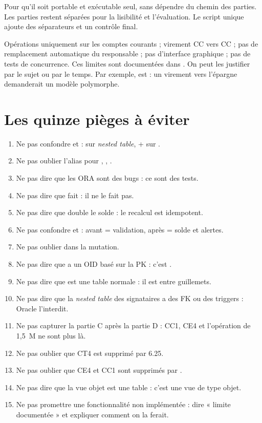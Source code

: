 {Pour qu'il soit portable et exécutable seul, sans dépendre du chemin des
parties.}
{Les parties restent séparées pour la lisibilité et l'évaluation. Le script
unique ajoute des séparateurs et un contrôle final.}

{Opérations uniquement sur les comptes courants ; virement CC vers CC ; pas de
remplacement automatique du responsable ; pas d'interface graphique ; pas de
tests de concurrence.}
{Ces limites sont documentées dans . On peut les
justifier par le sujet ou par le temps. Par exemple,
 est  : un
virement vers l'épargne demanderait un modèle polymorphe.}

\section{Les quinze pièges à éviter}

\begin{enumerate}
  \item Ne pas confondre  et  :
         sur \emph{nested table},  +
         sur .
  \item Ne pas oublier l'alias pour ,
        , .
  \item Ne pas dire que les ORA sont des bugs : ce sont des tests.
  \item Ne pas dire que  fait  : il ne le fait
        pas.
  \item Ne pas dire que  double le solde : le recalcul est
        idempotent.
  \item Ne pas confondre  et  :
        avant = validation, après = solde et alertes.
  \item Ne pas oublier  dans
        la mutation.
  \item Ne pas dire que  a un OID basé sur la PK : c'est
        .
  \item Ne pas dire que  est une table normale : il est entre
        guillemets.
  \item Ne pas dire que la \emph{nested table} des signataires a des FK ou des
        triggers : Oracle l'interdit.
  \item Ne pas capturer la partie C après la partie D : CC1, CE4 et
        l'opération de 1,5~M ne sont plus là.
  \item Ne pas oublier que CT4 est supprimé par 6.25.
  \item Ne pas oublier que CE4 et CC1 sont supprimés par .
  \item Ne pas dire que la vue objet est une table : c'est une vue de type
        objet.
  \item Ne pas promettre une fonctionnalité non implémentée : dire « limite
        documentée » et expliquer comment on la ferait.
\end{enumerate}

